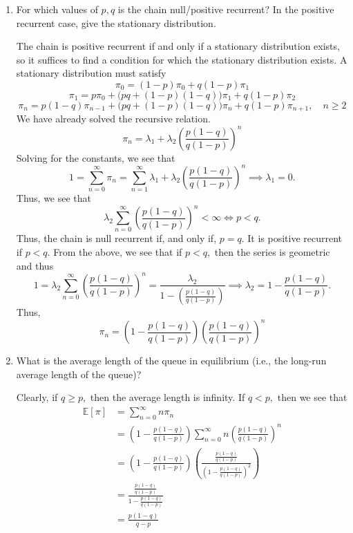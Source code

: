 \documentclass[11pt]{article}
\newcommand{\bbE}{\mathbb{E}}
\begin{document}
\begin{enumerate}[label=(\alph*)]
    \item For which values of \(p,q\) is the chain null/positive recurrent? In the positive recurrent case, give the stationary distribution.
\begin{solution}
    The chain is positive recurrent if and only if a stationary distribution exists, so it suffices to find a condition for which the stationary distribution exists. A stationary distribution must satisfy 
    \[\pi_0 = (1-p)\pi_0 + q(1-p)\pi_1\]
    \[\pi_1 = p \pi_0 + \big(pq +(1-p)(1-q)\big) \pi_1 + q(1-p)\pi_2\]
    \[\pi_n = p(1-q) \pi_{n-1} + \big(pq + (1-p)(1-q)\big)\pi_n + q(1-p)\pi_{n+1}, \quad n\geq 2\]
    We have already solved the recursive relation. 
    \[\pi_n = \lambda_1 + \lambda_2\left(\frac{p(1-q)}{q(1-p)}\right)^n\]
    Solving for the constants, we see that 
    \[1 = \sum_{n=0}^\infty \pi_n = \sum_{n=1}^\infty \lambda_1 + \lambda_2\left(\frac{p(1-q)}{q(1-p)}\right)^n \implies \lambda_1 = 0.\] Thus, we see that 
    \[\lambda_2\sum_{n=0}^\infty \left(\frac{p(1-q)}{q(1-p)}\right)^n < \infty \iff p < q.\] Thus, the chain is null recurrent if, and only if, $p = q.$ It is positive recurrent if $p<q.$ From the above, we see that if $p<q,$ then the series is geometric and thus 
    \[1 = \lambda_2\sum_{n=0}^\infty \left(\frac{p(1-q)}{q(1-p)}\right)^n = \frac{\lambda_2}{1 - (\frac{p(1-q)}{q(1-p)})} \implies \lambda_2 = 1 - \frac{p(1-q)}{q(1-p)}.\] Thus, 
    \[\pi_n = (1 - \frac{p(1-q)}{q(1-p)})\left(\frac{p(1-q)}{q(1-p)}\right)^n\]
\end{solution}
    
    \item What is the average length of the queue in equilibrium (i.e., the long-run average length of the queue)?
    \begin{solution}
        Clearly, if $q\geq p,$ then the average length is infinity. If $q<p,$ then we see that 
\begin{align*}
\bbE[\pi] &= \sum_{n=0}^\infty n\pi_n\\ &= (1 - \frac{p(1-q)}{q(1-p)})\sum_{n=0}^\infty n\left(\frac{p(1-q)}{q(1-p)}\right)^n\\ &= (1 - \frac{p(1-q)}{q(1-p)})\left(\frac{\frac{p(1-q)}{q(1-p)}}{(1 - \frac{p(1-q)}{q(1-p)})^2}\right)\\ &= \frac{\frac{p(1-q)}{q(1-p)}}{1 - \frac{p(1-q)}{q(1-p)}}\\ &= \frac{p(1-q)}{q-p}    
\end{align*}

    \end{solution}
\end{enumerate}
\end{document}
